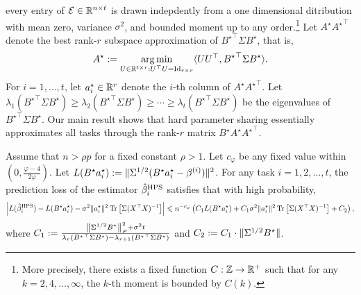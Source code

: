 every entry of $\mathcal{E} \in \mathbb{R}^{n \times t}$ is drawn indepdently from a one dimensional ditribution with mean zero, variance $\sigma^2$, and bounded moment up to any order.\footnote{More precisely, there exists a fixed function $C: \mathbb{Z} \rightarrow \mathbb{R}^+$ such that for any $k = 2, 4, \dots, \infty$, the $k$-th moment is bounded by $C(k)$.}
Let $A^{\star} {A^{\star}}^{\top}$ denote the best rank-$r$ subspace approximation of ${B^{\star}}^\top\Sigma B^{\star}$, that is,
\[ A^{\star} := \operatorname*{arg\,min}_{U\in\mathbb{R}^{t\times r} : U^{\top} U = \operatorname{Id}_{r\times r}} \langle U U^{\top}, {B^{\star}}^{\top} \Sigma B^{\star} \rangle. \]
For $i = 1,\dots, t$, let $a_i^{\star} \in\mathbb{R}^r$ denote the $i$-th column of $A^{\star}{A^{\star}}^{\top}$.
Let $\lambda_1({B^\star}^\top \Sigma B^\star)\ge\lambda_2({B^\star}^\top \Sigma B^\star)\ge \cdots \ge \lambda_t({B^\star}^\top \Sigma B^\star)$ be the eigenvalues of ${B^\star}^\top \Sigma B^\star$.
Our main result shows that hard parameter sharing essentially approximates all tasks through the rank-$r$ matrix $B^{\star} A^{\star} {A^{\star}}^{\top}$.

\begin{theorem}\label{thm_many_tasks}
	Assume that $n > \rho p$ for a fixed constant $\rho > 1$.
	Let $c_{\varphi}$ be any fixed value within $(0, \frac{\varphi-4}{2\varphi})$.
	Let $L(B^{\star}a_i^{\star}): = \|\Sigma^{1/2} (B^{\star} a_i^{\star}- \beta^{(i)})\|^2$.
	For any task $i = 1, 2, \dots, t$, the prediction loss of the estimator $\hat{\beta}_i^{\textup{HPS}}$ satisfies that with high probability,
	\begin{align*}
		{\left| {L(\hat{\beta}_i^{\textup{HPS}}) - L(B^{\star}a_i^{\star}) - \sigma^2 \|a_i^{\star}\|^2 \operatorname{Tr}\left[\Sigma (X^{\top}X)^{-1}\right]} \right|}
		\leqslant n^{-c_{\varphi}}\left({C_1 L(B^{\star}a_i^{\star}) + C_1 \sigma^2 \|a_i^{\star}\|^2 \operatorname{Tr}\left[\Sigma (X^{\top}X)^{-1}\right] + C_2}\right),
	\end{align*}
	where $C_1: = \frac{\left\| \Sigma^{1/2} B^{\star} \right\|_{F}^2 + \sigma^2 t}{\lambda_r ({B^\star}^\top \Sigma B^\star)- \lambda_{r+1}({B^\star}^\top \Sigma B^\star)}$ and $C_2 :=  C_1\cdot \|\Sigma^{1/2} B^{\star}\|$.
\end{theorem}

